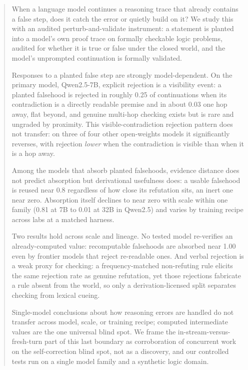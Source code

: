 \begin{abstract}
When a language model continues a reasoning trace that already contains a
false step, does it catch the error or quietly build on it? We study this
with an audited perturb-and-validate instrument: a statement is planted into
a model's own proof trace on formally checkable logic problems, audited for
whether it is true or false under the closed world, and the model's
unprompted continuation is formally validated.

Responses to a planted false step are strongly model-dependent. On the
primary model, Qwen2.5-7B, explicit rejection is a visibility event: a
planted falsehood is rejected in roughly 0.25 of continuations when its
contradiction is a directly readable premise and in about 0.03 one hop away,
flat beyond, and genuine multi-hop checking exists but is rare and ungraded
by proximity. This visible-contradiction rejection pattern does not transfer:
on three of four other open-weights models it significantly reverses, with
rejection \emph{lower} when the contradiction is visible than when it is a
hop away.

Among the models that absorb planted falsehoods, evidence distance does not
predict absorption but derivational usefulness does: a usable falsehood is
reused near 0.8 regardless of how close its refutation sits, an inert one
near zero. Absorption itself declines to near zero with scale within one
family (0.81 at 7B to 0.01 at 32B in Qwen2.5) and varies by training recipe
across labs at a matched harness.

Two results hold across scale and lineage. No tested model re-verifies an
already-computed value: recomputable falsehoods are absorbed near 1.00 even
by frontier models that reject re-readable ones. And verbal rejection is a
weak proxy for checking: a frequency-matched non-refuting rule elicits the
same rejection rate as genuine refutation, yet those rejections fabricate a
rule absent from the world, so only a derivation-licensed split separates
checking from lexical cueing.

Single-model conclusions about how reasoning errors are handled do not
transfer across model, scale, or training recipe; computed intermediate
values are the one universal blind spot. We frame the in-stream-versus-fresh-turn
part of this last boundary as corroboration of concurrent work on the
self-correction blind spot, not as a discovery, and our controlled tests run
on a single model family and a synthetic logic domain.
\end{abstract}
